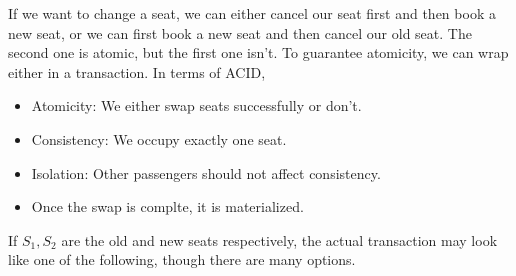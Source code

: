 \documentclass{report}
\newenvironment{example}{\begin{tcolorbox}[title={Example},colback=green!5!white,colframe=black!75!green]}{\end{tcolorbox}}
\begin{document}
\begin{example}
    If we want to change a seat, we can either cancel our seat first and then book
    a new seat, or we can first book a new seat and then cancel our old seat.
    The second one is atomic, but the first one isn't. To guarantee atomicity,
    we can wrap either in a transaction. In terms of ACID,
    \begin{itemize}[label=$\to$]
        \item Atomicity: We either swap seats successfully or don't.
        \item Consistency: We occupy exactly one seat.
        \item Isolation: Other passengers should not affect consistency.
        \item Once the swap is complte, it is materialized.
    \end{itemize}

    If $S_1, S_2$ are the old and new seats respectively, the actual transaction
    may look like one of the following, though there are many options.


\end{example}
\end{document}
